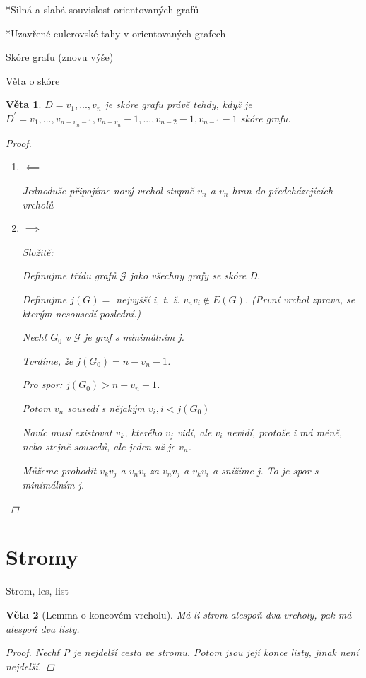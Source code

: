 \documentclass[10pt,a4paper]{article}
\theoremstyle{plain}
\newtheorem{veta}{Věta}
\theoremstyle{definition}
\begin{document}
*Silná a slabá souvislost orientovaných grafů

*Uzavřené eulerovské tahy v orientovaných grafech

Skóre grafu (znovu výše)

Věta o skóre
\begin{veta}
$D = v_1, ..., v_n$ je skóre grafu právě tehdy, když je $D^\prime = v_1, ...,v_{n - v_n - 1}, v_{n - v_n} -1 ,..., v_{n-2} - 1, v_{n-1} - 1$ skóre grafu.
\begin{proof}
\begin{enumerate}
\item $\impliedby$

Jednoduše připojíme nový vrchol stupně $v_n$ a $v_n$ hran do předcházejících vrcholů
\item $\implies$

Složitě:

Definujme třídu grafů $\mathcal{G}$ jako všechny grafy se skóre D.

Definujme $j(G) =$ nejvyšší i, t. ž. $v_nv_i \notin E(G)$. (První vrchol zprava, se kterým nesousedí poslední.) 

Nechť $G_0$ v $\mathcal{G}$ je graf s minimálním j.

Tvrdíme, že $j(G_0) = n - v_n -1$.

Pro spor:  $j(G_0) > n - v_n -1$.

Potom $v_n$ sousedí s nějakým $v_i, i < j(G_0)$

Navíc musí existovat $v_k$, kterého $v_j$ vidí, ale $v_i$ nevidí, protože i má méně, nebo stejně sousedů, ale jeden už je $v_n$.

Můžeme prohodit $v_k v_j$ a  $v_n v_i$ za $v_n v_j$ a  $v_k v_i$ a snížíme j. To je spor s minimálním j.

\end{enumerate}
\end{proof}
\end{veta}

\section{Stromy}

Strom, les, list

\begin{veta}[Lemma o koncovém vrcholu]
Má-li strom alespoň dva vrcholy, pak má alespoň dva listy.
\begin{proof}
Nechť P je nejdelší cesta ve stromu. Potom jsou její konce listy, jinak není nejdelší.
\end{proof}
\end{veta}
\end{document}
